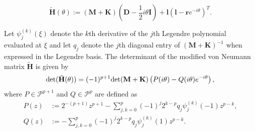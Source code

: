 \documentclass[10pt,a4paper]{amsart}
\begin{document}
\begin{equation}
    \tilde{\mathbf{H}}(\theta) :=(\mathbf{M} + \mathbf{K})\left(\mathbf{D} -\frac{1}{2}i\theta \mathbf{I}\right) +\mathbf{l}\left(\mathbf{l}-\mathbf{r}e^{-i\theta}\right)^T.
    \label{eq:tildeH}
\end{equation}

\begin{lemma}
\label{lem:rational_approx}
Let $\psi^{(k)}_j(\xi)$ denote the $k$th derivative of the $j$th Legendre polynomial evaluated at $\xi$ and let $q_j$ denote the $j$th diagonal entry of $(\mathbf{M}+\mathbf{K})^{-1}$ when expressed in the Legendre basis. The determinant of the modified von Neumann matrix $\tilde{\mathbf{H}}$ is given by
\begin{equation}
     \text{\textup{det}}(\tilde{\mathbf{H}}(\theta)) =
    (-1)^{p+1}\text{\textup{det}}(\mathbf{M}+\mathbf{K})
    \left(P(i\theta) - Q(i\theta)e^{-i\theta}\right),
    \label{eq:simp1}
\end{equation}
where $P \in \mathcal{P}^{p+1}$ and $Q \in \mathcal{P}^{p}$ are defined as
\begin{align}
    P(z) &:=2^{-(p+1)}z^{p+1}-\sum_{j,k=0}^p (-1)^j2^{k-p} q_j\psi^{(k)}_j(-1)z^{p-k}, \label{eq:approximant_P} \\
    Q(z) &:=-\sum_{j,k=0}^p (-1)^j2^{k-p} q_j\psi^{(k)}_j(1)z^{p-k}. \label{eq:approximant_Q}
\end{align}
\end{lemma}
\end{document}
